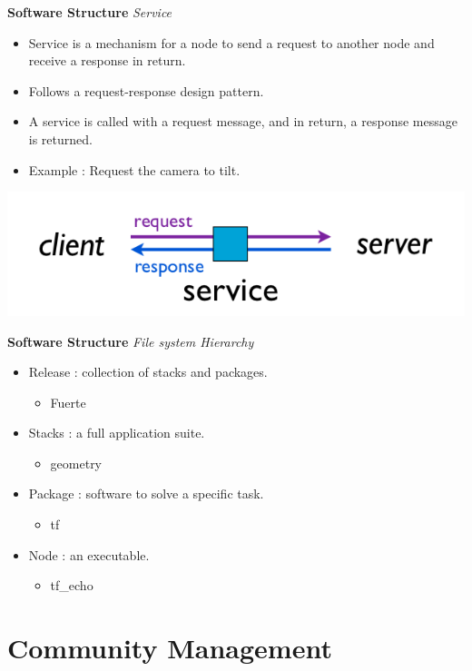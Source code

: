\documentclass[a4paper, 10pt, conference]{ieeeconf}       %
\begin{document}
\textbf{Software Structure}
\textit{Service}

\begin{itemize}
  \item Service is a mechanism for a node to send a request to another node and receive a response in return.
  \item Follows a request-response design pattern.
  \item A service is called with a request message, and in return, a response message is returned.
  \item Example : Request the camera to tilt.
\end{itemize}

\begin{center}
  \includegraphics[width=.6\textwidth]{service}
\end{center}



\textbf{Software Structure}
\textit{File system Hierarchy}

\begin{itemize}
  \item Release : collection of stacks and packages.
  \begin{itemize}
    \item Fuerte
  \end{itemize}
  \item Stacks : a full application suite.
  \begin{itemize}
    \item geometry
  \end{itemize}
  \item Package : software to solve a specific task.
  \begin{itemize}
    \item tf
  \end{itemize}
  \item Node : an executable.
  \begin{itemize}
    \item tf\_echo
  \end{itemize}
\end{itemize}



\section{Community Management}
\end{document}

